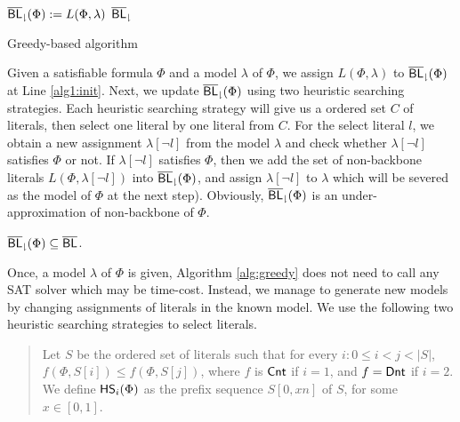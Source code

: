 \begin{algorithm}
\SetAlgoShortEnd
\SetFillComment
{}
${\sf \overline{BL}_\downharpoonright}(\Phi):=L(\Phi,\lambda)$\; \label{alg1:init}
\For{${\sf HS}$ from ${\sf HS}_1$ to ${\sf HS}_2$}{
    $C:={\sf HS}(\Phi)$\;
    $i:=0$\;
    \While{$i<|C|$}{
        $i:=i+1$,  $l:=C[i]$\;
        \If{$\lambda[\neg l]\models \Phi$}
        {
           $\NBLap(\Phi):=\NBLap(\Phi)\cup L(\Phi,\lambda[\neg l])$\;
           $\lambda:=\lambda[\neg l]$\; 
        }
}

}\label{alg1:loopend}
\Return ${\sf \overline{BL}_\downharpoonright}$\;
\caption{Greedy-based algorithm}
\label{alg:greedy}
\end{algorithm}
Given a satisfiable formula $\Phi$ and a model $\lambda$ of $\Phi$,
we assign $L(\Phi,\lambda)$ to ${\sf \overline{BL}_\downharpoonright}(\Phi)$ at Line \ref{alg1:init}. Next, we update
${\sf \overline{BL}_\downharpoonright}(\Phi)$ using two heuristic searching strategies. %
Each heuristic searching strategy will give us a ordered set $C$ of literals, then select one literal by one literal from
$C$. For the select literal $l$, we obtain a new assignment $\lambda[\neg l]$ from the model
$\lambda$ and check whether  $\lambda[\neg l]$ satisfies $\Phi$ or not.
If $\lambda[\neg l]$ satisfies $\Phi$, then we add the set of non-backbone literals $L(\Phi,\lambda[\neg l])$ into ${\sf \overline{BL}_\downharpoonright}(\Phi)$, and
assign $\lambda[\neg l]$ to $\lambda$ which will be severed as the model of $\Phi$ at the next step).
Obviously,  ${\sf \overline{BL}_\downharpoonright}(\Phi)$ is an under-approximation of non-backbone of $\Phi$.

\begin{theorem}
${\sf \overline{BL}_\downharpoonright}(\Phi)\subseteq\overline{\textsf{BL}}$.
\end{theorem}

Once, a model $\lambda$ of $\Phi$ is given, Algorithm \ref{alg:greedy} does not need to call any SAT solver which may be time-cost.
Instead, we manage to generate new models by changing assignments of literals in the known model.
We use the following two heuristic searching strategies to select literals. %
\begin{quote}
Let $S$ be the ordered set of literals such that for every $i: 0\leq i<j<|S|$,
$f(\Phi,S[i])\leq f(\Phi,S[j])$, where $f$ is $\textsf{Cnt}$ if $i=1$, and $f=\textsf{Dnt}$ if $i=2$.
We define ${\sf HS}_i(\Phi)$ as the prefix sequence $S[0,xn]$ of $S$, for some $x\in[0,1]$.
\end{quote}
 

